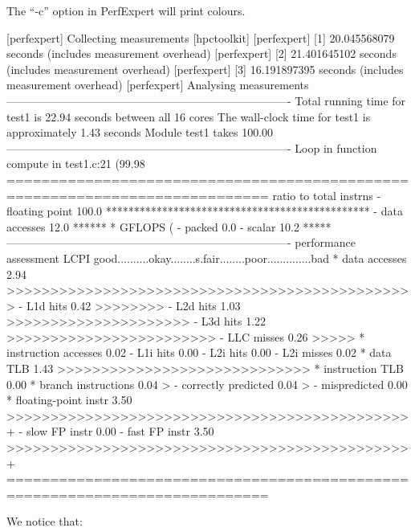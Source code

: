 The ``-c'' option in PerfExpert will print colours.

\begin{prompt}
[perfexpert] Collecting measurements [hpctoolkit]
[perfexpert]    [1] 20.045568079 seconds (includes measurement overhead)
[perfexpert]    [2] 21.401645102 seconds (includes measurement overhead)
[perfexpert]    [3] 16.191897395 seconds (includes measurement overhead)
[perfexpert] Analysing measurements
----------------------------------------------------------------------------
Total running time for test1 is 22.94 seconds between all 16 cores
The wall-clock time for test1 is approximately 1.43 seconds
Module test1 takes 100.00%
----------------------------------------------------------------------------
Loop in function compute in test1.c:21 (99.98%
============================================================================
ratio to total instrns    %
 - floating point      100.0 ***********************************************
 - data accesses        12.0 ******
* GFLOPS (%
 - packed                0.0
 - scalar               10.2 *****
----------------------------------------------------------------------------
performance assessment  LCPI good..........okay........s.fair........poor..............bad
* data accesses         2.94 >>>>>>>>>>>>>>>>>>>>>>>>>>>>>>>>>>>>>>>>>>>>>>>
 - L1d hits             0.42 >>>>>>>>
 - L2d hits             1.03 >>>>>>>>>>>>>>>>>>>>>
 - L3d hits             1.22 >>>>>>>>>>>>>>>>>>>>>>>>
 - LLC misses           0.26 >>>>>
* instruction accesses  0.02
 - L1i hits              0.00
 - L2i hits             0.00
 - L2i misses           0.02
* data TLB              1.43 >>>>>>>>>>>>>>>>>>>>>>>>>>>>>
* instruction TLB       0.00
* branch instructions   0.04 >
 - correctly predicted  0.04 >
 - mispredicted         0.00
* floating-point instr  3.50 >>>>>>>>>>>>>>>>>>>>>>>>>>>>>>>>>>>>>>>>>>>>>>+
 - slow FP instr        0.00
 - fast FP instr        3.50 >>>>>>>>>>>>>>>>>>>>>>>>>>>>>>>>>>>>>>>>>>>>>>+
============================================================================
\end{prompt}

We notice that:

